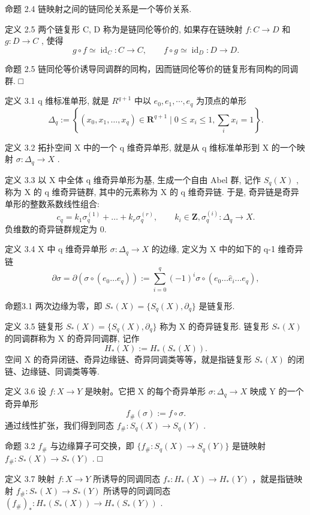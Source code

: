 \documentclass[]{article}
\begin{document}
命题 2.4 链映射之间的链同伦关系是一个等价关系. 

定义 2.5 两个链复形 C, D 称为是链同伦等价的, 如果存在链映射 $f: C \rightarrow D$ 和 $g: D \rightarrow C$ , 使得 $$
g \circ f \simeq \operatorname{id} _ {C}: C \to C, \qquad f \circ g \simeq \operatorname{id} _ {D}: D \to D.
$$

命题 2.5 链同伦等价诱导同调群的同构，因而链同伦等价的链复形有同构的同调群. □ 

定义 3.1 q 维标准单形, 就是 $R^{q+1}$ 中以 $e_{0}, e_{1}, \cdots, e_{q}$ 为顶点的单形 $$
\Delta_ {q} := \left\{(x _ {0}, x _ {1}, \dots , x _ {q}) \in \boldsymbol {R} ^ {q + 1} \mid 0 \leq x _ {i} \leq 1, \sum_ {i} x _ {i} = 1 \right\}.
$$

定义 3.2 拓扑空间 X 中的一个 q 维奇异单形, 就是从 q 维标准单形到 X 的一个映射 $\sigma: \Delta_{q} \rightarrow X$ . 

定义 3.3 以 X 中全体 q 维奇异单形为基, 生成一个自由 Abel 群, 记作 $S_{q}(X)$ , 称为 X 的 q 维奇异链群, 其中的元素称为 X 的 q 维奇异链. 于是, 奇异链是奇异单形的整数系数线性组合: $$
c _ {q} = k _ {1} \sigma_ {q} ^ {(1)} + \dots + k _ {r} \sigma_ {q} ^ {(r)}, \qquad k _ {i} \in \mathbf {Z}, \sigma_ {q} ^ {(i)}: \Delta_ {q} \to X.
$$负维数的奇异链群规定为 0. 

定义 3.4 X 中 q 维奇异单形 $\sigma: \Delta_{q} \rightarrow X$ 的边缘, 定义为 X 中的如下的 q-1 维奇异链 $$
\partial \sigma = \partial (\sigma \circ (e _ {0} \dots e _ {q})) := \sum_ {i = 0} ^ {q} (- 1) ^ {i} \sigma \circ (e _ {0} \dots \widehat {e} _ {i} \dots e _ {q}),
$$

命题3.1 两次边缘为零，即 $S_{*}(X) = \{S_{q}(X),\partial_{q}\}$ 是链复形. 	


定义 3.5 链复形 $S_{*}(X)=\{S_{q}(X),\partial_{q}\}$ 称为 X 的奇异链复形. 链复形 $S_{*}(X)$ 的同调群称为 X 的奇异同调群, 记作 $$
H _ {*} (X) := H _ {*} (S _ {*} (X)).
$$空间 X 的奇异闭链、奇异边缘链、奇异同调类等等，就是指链复形 $S_{*}(X)$ 的闭链、边缘链、同调类等等. 

定义 3.6 设 $f: X \rightarrow Y$ 是映射。它把 X 的每个奇异单形 $\sigma: \Delta_{q} \rightarrow X$ 映成 Y 的一个奇异单形$$
f _ {\#} (\sigma) := f \circ \sigma .
$$ 通过线性扩张，我们得到同态 $f_{\#}: S_q(X) \to S_q(Y)$ . 

命题 3.2 $f_{\#}$ 与边缘算子可交换，即 $\{f_{\#}:S_{q}(X)\to S_{q}(Y)\}$ 是链映射 $f_{\#}:S_{*}(X)\to S_{*}(Y)$ . □ 

定义 3.7 映射 $f: X \to Y$ 所诱导的同调同态 $f_{*}: H_{*}(X) \to H_{*}(Y)$ ，就是指链映射 $f_{\#}: S_{*}(X) \to S_{*}(Y)$ 所诱导的同调同态 $(f_{\#})_{*}: H_{*}(S_{*}(X)) \to H_{*}(S_{*}(Y))$ . 
\end{document}

